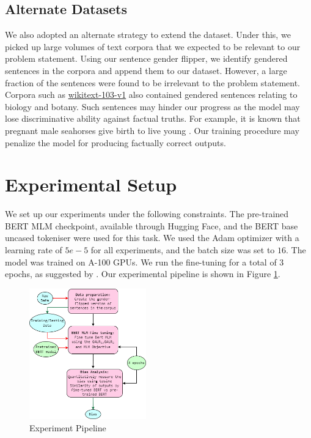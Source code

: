 \documentclass[10pt,twocolumn,letterpaper]{article}
\begin{document}
\subsection{Alternate Datasets}
We also adopted an alternate strategy to extend the dataset.
Under this, we picked up large volumes of text corpora that we expected to be relevant to our problem statement.
Using our sentence gender flipper, we identify gendered sentences in the corpora and append them to our dataset.
However, a large fraction of the sentences were found to be irrelevant to the problem statement.
Corpora such as \href{https://huggingface.co/datasets/wikitext}{wikitext-103-v1} also contained gendered sentences relating to biology and botany.
Such sentences may hinder our progress as the model may lose discriminative ability against factual truths.
For example, it is known that pregnant male seahorses give birth to live young \cite{seahorse}.
Our training procedure may penalize the model for producing factually correct outputs.

\section{Experimental Setup}
We set up our experiments under the following constraints.
The pre-trained BERT MLM checkpoint, available through Hugging Face, and the BERT base uncased tokeniser were used for this task.
We used the Adam optimizer with a learning rate of $5e-5$ for all experiments, and the batch size was set to $16$.
The model was trained on A-100 GPUs.
We run the fine-tuning for a total of 3 epochs, as suggested by \cite{bert}.
Our experimental pipeline is shown in Figure \ref{fig:pipeline}.
\begin{figure}
    \centering
    \includegraphics[width=0.45\textwidth]{Assets/pipeline.png}
    \caption{Experiment Pipeline}
    \label{fig:pipeline}
\end{figure}
\end{document}
